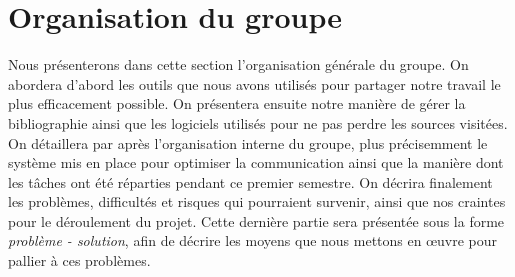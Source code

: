 \section{Organisation du groupe}
Nous présenterons dans cette section l'organisation générale du groupe.
On abordera d'abord les outils que nous avons utilisés pour partager 
notre travail le plus efficacement possible.
On présentera ensuite notre manière de gérer la bibliographie
ainsi que les logiciels utilisés pour ne pas perdre les sources visitées.
On détaillera par après l'organisation interne du groupe,
plus précisemment le système mis en place pour optimiser la communication
ainsi que la manière dont les tâches ont été réparties pendant 
ce premier semestre.
On décrira finalement les problèmes, difficultés et risques qui
pourraient survenir, ainsi que nos craintes pour le déroulement du projet. 
Cette dernière partie sera présentée sous
la forme \emph{problème - solution}, afin de décrire les
moyens que nous mettons en \oe{}uvre pour pallier à ces problèmes.




